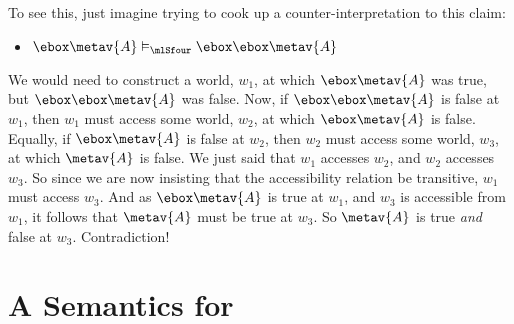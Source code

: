 To see this, just imagine trying to cook up a counter-interpretation to this claim:
\begin{itemize}
	\item[]$\ebox\metav{A} \entails_\mlSfour \ebox \ebox \metav{A}$
\end{itemize}
We would need to construct a world, $w_1$, at which $\ebox\metav{A}$ was true, but $\ebox \ebox \metav{A}$ was false. Now, if $\ebox \ebox \metav{A}$ is false at $w_1$, then $w_1$ must access some world, $w_2$, at which $\ebox\metav{A}$ is false. Equally, if $\ebox \metav{A}$ is false at $w_2$, then $w_2$ must access some world, $w_3$, at which $\metav{A}$ is false. We just said that $w_1$ accesses $w_2$, and $w_2$ accesses $w_3$. So since we are now insisting that the accessibility relation be transitive, $w_1$ must access $w_3$. And as $\ebox\metav{A}$ is true at $w_1$, and $w_3$ is accessible from $w_1$, it follows that $\metav{A}$ must be true at $w_3$. So $\metav{A}$ is true \emph{and} false at $w_3$. Contradiction!

\section{A Semantics for \mlSfive}
\label{SemanticsS5}

